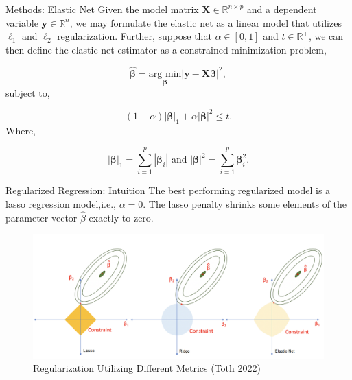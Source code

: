 \documentclass[
  11pt,
  ignorenonframetext,
]{beamer}
\begin{document}
\begin{frame}{Methods: Elastic Net}
\protect\hypertarget{methods-elastic-net}{}
Given the model matrix \(\mathbf{X} \in \mathbb{R}^{n\times p}\) and a
dependent variable \(\mathbf{y} \in \mathbb{R}^n\), we may formulate the
elastic net as a linear model that utilizes \(\ell_1\) and \(\ell_2\)
regularization. Further, suppose that \(\alpha \in [0, 1]\) and
\(t \in \mathbb{R}^+\), we can then define the elastic net estimator as
a constrained minimization problem,

\[ 
\boldsymbol{\hat{\beta}} = \underset{\boldsymbol{\beta}}{\text{arg min}} |\mathbf{y} - \mathbf{X}\boldsymbol{\beta}|^2,
\] subject to,

\[
(1 - \alpha)|\boldsymbol{\beta}|_1 + \alpha|\boldsymbol{\beta}|^2 \leq t. 
\] Where,

\[
|\boldsymbol{\beta}|_1 = \sum\limits_{i = 1}^{p}|\boldsymbol{\beta}_i|\text{ and } |\boldsymbol{\beta}|^2 = \sum\limits_{i = 1}^{p}\boldsymbol{\beta}_i^2.
\]
\end{frame}

\begin{frame}{Regularized Regression:
\href{https://www.desmos.com/calculator/59axr4plef}{Intuition}}
\protect\hypertarget{regularized-regression-intuition}{}
The best performing regularized model is a lasso regression model,i.e.,
\(\alpha = 0\). The lasso penalty shrinks some elements of the parameter
vector \(\hat\beta\) exactly to zero.

\begin{figure}

{\centering \includegraphics[width=0.9\linewidth]{./../figures/lasso_ridge} 

}

\caption{Regularization Utilizing Different Metrics (Toth 2022)}\label{fig:unnamed-chunk-5}
\end{figure}
\end{frame}
\end{document}
